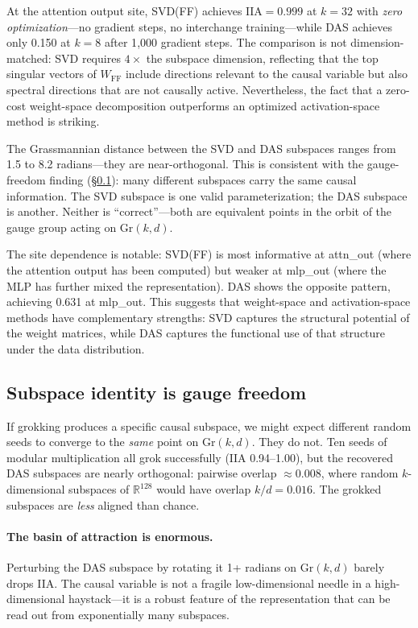 \documentclass{article}
\newcommand{\Gr}{\mathrm{Gr}}
\newcommand{\IIA}{\mathrm{IIA}}
\newcommand{\R}{\mathbb{R}}
\begin{document}
At the attention output site, SVD(FF) achieves $\IIA = 0.999$ at $k = 32$
with \emph{zero optimization}---no gradient steps, no interchange
training---while DAS achieves only 0.150 at $k = 8$ after 1{,}000 gradient
steps. The comparison is not dimension-matched: SVD requires $4\times$ the
subspace dimension, reflecting that the top singular vectors of $W_\text{FF}$
include directions relevant to the causal variable but also spectral
directions that are not causally active. Nevertheless, the fact that a
zero-cost weight-space decomposition outperforms an optimized
activation-space method is striking.

The Grassmannian distance between the SVD and DAS subspaces ranges from
1.5 to 8.2 radians---they are near-orthogonal. This is consistent with
the gauge-freedom finding (\S\ref{sec:gauge_freedom}): many different
subspaces carry the same causal information. The SVD subspace is one
valid parameterization; the DAS subspace is another. Neither is
``correct''---both are equivalent points in the orbit of the gauge
group acting on $\Gr(k,d)$.

The site dependence is notable: SVD(FF) is most informative at attn\_out
(where the attention output has been computed) but weaker at mlp\_out
(where the MLP has further mixed the representation). DAS shows the
opposite pattern, achieving 0.631 at mlp\_out. This suggests that
weight-space and activation-space methods have complementary strengths:
SVD captures the structural potential of the weight matrices, while DAS
captures the functional use of that structure under the data distribution.

\subsection{Subspace identity is gauge freedom}
\label{sec:gauge_freedom}

If grokking produces a specific causal subspace, we might expect different
random seeds to converge to the \emph{same} point on $\Gr(k,d)$. They do
not. Ten seeds of modular multiplication all grok successfully ($\IIA$
0.94--1.00), but the recovered DAS subspaces are nearly orthogonal: pairwise
overlap $\approx 0.008$, where random $k$-dimensional subspaces of
$\R^{128}$ would have overlap $k/d = 0.016$. The grokked subspaces are
\emph{less} aligned than chance.

\paragraph{The basin of attraction is enormous.}
Perturbing the DAS subspace by rotating it 1+ radians on $\Gr(k,d)$
barely drops IIA. The causal variable is not a fragile low-dimensional
needle in a high-dimensional haystack---it is a robust feature of the
representation that can be read out from exponentially many subspaces.
\end{document}
